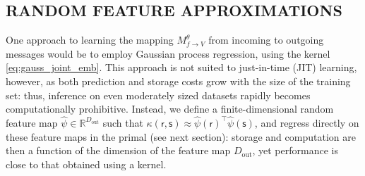 \documentclass[english]{article}
\theoremstyle{plain}
\theoremstyle{plain}
\newcommand{\factor}{f}				%
\newcommand{\outV}{V}                         %
\newcommand{\approxMsg}[3]{M_{#1 \rightarrow #2}^{#3}}			%
\begin{document}




\subsection{RANDOM FEATURE APPROXIMATIONS}
\label{sec:randomFeatureApproximations}

One approach to learning the mapping  $\approxMsg{\factor}{\outV}{\theta}$ from incoming to outgoing messages
would be to employ Gaussian process regression, using the kernel \eqref{eq:gauss_joint_emb}.
This approach is not suited to just-in-time (JIT) learning, however,
as both prediction and storage costs grow with the size of the training set:
thus, inference on even moderately sized datasets rapidly becomes computationally prohibitive.
Instead, we define 
a finite-dimensional random feature map $\hat{\psi} \in \mathbb{R}^{D_\mathrm{out}}$ such that 
$\kappa(\mathsf{r}, \mathsf{s}) \approx \hat{\psi}(\mathsf{r})^\top \hat{\psi}(\mathsf{s})$, 
and regress directly on these feature maps in the primal (see next section): storage and computation 
are then a function of the dimension of the feature map $D_\mathrm{out}$, yet performance is close to that
obtained using a kernel.
\end{document}
